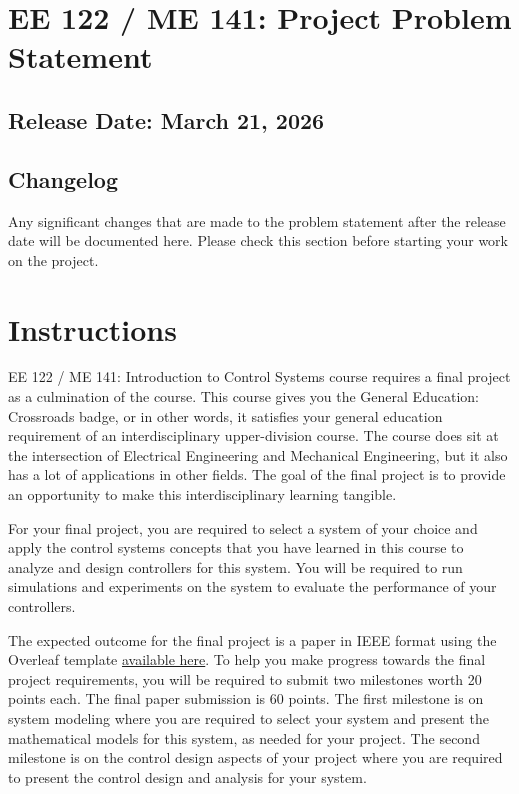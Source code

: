 \documentclass{ee122_notes}
\renewcommand{\releasedate}{March 21, 2026}
\begin{document}
\section*{EE 122 / ME 141: Project Problem Statement}
\subsection*{Release Date: \releasedate}
{\color{blue}
\subsection*{Changelog}
Any significant changes that are made to the problem statement after the release date will be documented here. Please check this section before starting your work on the project.
}


\section{Instructions}
EE 122 / ME 141: Introduction to Control Systems course requires a final project as a culmination of the course. This course gives you the General Education: Crossroads badge, or in other words, it satisfies your general education requirement of an interdisciplinary upper-division course. The course does sit at the intersection of Electrical Engineering and Mechanical Engineering, but it also has a lot of applications in other fields. The goal of the final project is to provide an opportunity to make this interdisciplinary learning tangible.

For your final project, you are required to select a system of your choice and apply the control systems concepts that you have learned in this course to analyze and design controllers for this system. You will be required to run simulations and experiments on the system to evaluate the performance of your controllers.

The expected outcome for the final project is a paper in IEEE format using the Overleaf template \href{https://www.overleaf.com/latex/templates/ieee-conference-template/grfzhhncsfqn}{available here}. To help you make progress towards the final project requirements, you will be required to submit two milestones worth 20 points each. The final paper submission is 60 points. The first milestone is on system modeling where you are required to select your system and present the mathematical models for this system, as needed for your project. The second milestone is on the control design aspects of your project where you are required to present the control design and analysis for your system.
\end{document}
